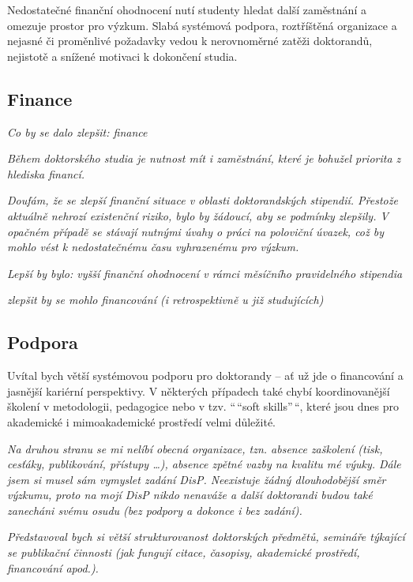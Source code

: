 \documentclass[
  czech,
  14pt,
  a4paper,
  DIV=11,
  numbers=noendperiod]{scrreprt}
\begin{document}
Nedostatečné finanční ohodnocení nutí studenty hledat další zaměstnání a
omezuje prostor pro výzkum. Slabá systémová podpora, roztříštěná
organizace a nejasné či proměnlivé požadavky vedou k nerovnoměrné zatěži
doktorandů, nejistotě a snížené motivaci k dokončení studia.

\subsection{Finance}\label{finance}

\emph{Co by se dalo zlepšit: finance}

\emph{Během doktorského studia je nutnost mít i zaměstnání, které je
bohužel priorita z hlediska financí.}

\emph{Doufám, že se zlepší finanční situace v oblasti doktorandských
stipendií. Přestože aktuálně nehrozí existenční riziko, bylo by žádoucí,
aby se podmínky zlepšily. V opačném případě se stávají nutnými úvahy o
práci na poloviční úvazek, což by mohlo vést k nedostatečnému času
vyhrazenému pro výzkum.}

\emph{Lepší by bylo: vyšší finanční ohodnocení v rámci měsíčního
pravidelného stipendia}

\emph{zlepšit by se mohlo financování (i retrospektivně u již
studujících)}

\subsection{Podpora}\label{podpora}

Uvítal bych větší systémovou podporu pro doktorandy -- ať už jde o
financování a jasnější kariérní perspektivy. V některých případech také
chybí koordinovanější školení v metodologii, pedagogice nebo v tzv.
``\,``soft skills''\,``, které jsou dnes pro akademické i mimoakademické
prostředí velmi důležité.

\emph{Na druhou stranu se mi nelíbí obecná organizace, tzn. absence
zaškolení (tisk, cesťáky, publikování, přístupy \ldots), absence zpětné
vazby na kvalitu mé výuky. Dále jsem si musel sám vymyslet zadání DisP.
Neexistuje žádný dlouhodobější směr výzkumu, proto na mojí DisP nikdo
nenaváže a další doktorandi budou také zanecháni svému osudu (bez
podpory a dokonce i bez zadání).}

\emph{Představoval bych si větší strukturovanost doktorských předmětů,
semináře týkající se publikační činnosti (jak fungují citace, časopisy,
akademické prostředí, financování apod.).}
\end{document}
